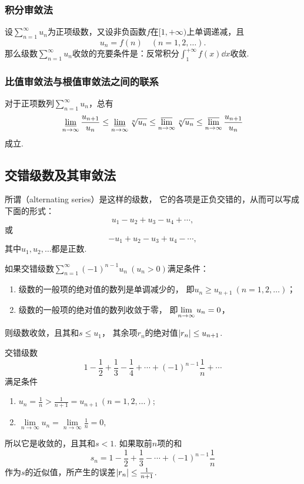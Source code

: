 \subsubsection{积分审敛法}
\begin{theorem}[积分审敛法]\label{theorem:无穷级数.积分审敛法}
设\(\sum\limits_{n=1}^\infty u_n\)为正项级数，又设非负函数\(f\)在\([1,+\infty)\)上单调递减，且\[
u_n = f(n)
\quad(n=1,2,\dotsc).
\]那么级数\(\sum\limits_{n=1}^\infty u_n\)收敛的充要条件是：反常积分\(\int_1^{+\infty} f(x) \dd{x}\)收敛.
\end{theorem}

\subsubsection{比值审敛法与根值审敛法之间的联系}
\begin{theorem}
对于正项数列\(\sum\limits_{n=1}^\infty u_n\)，总有\[
\varliminf\limits_{n\to\infty} \frac{u_{n+1}}{u_n}
\leq
\varliminf\limits_{n\to\infty} \sqrt[n]{u_n}
\leq
\varlimsup\limits_{n\to\infty} \sqrt[n]{u_n}
\leq
\varlimsup\limits_{n\to\infty} \frac{u_{n+1}}{u_n}
\]成立.
\end{theorem}

\subsection{交错级数及其审敛法}
所谓（alternating series）是这样的级数，
它的各项是正负交错的，从而可以写成下面的形式：\[
u_1 - u_2 + u_3 - u_4 + \dotsb,
\]或\[
-u_1 + u_2 - u_3 + u_4 - \dotsb,
\]其中\(u_1,u_2,\dotsc\)都是正数.

\begin{theorem}[莱布尼茨定理]\label{theorem:无穷级数.莱布尼茨定理}
如果交错级数\(\sum\limits_{n=1}^\infty (-1)^{n-1} u_n\ (u_n>0)\)满足条件：
\begin{enumerate}
\item 级数的一般项的绝对值的数列是单调减少的，
即\(u_n \geq u_{n+1}\ (n=1,2,\dotsc)\)；

\item 级数的一般项的绝对值的数列收敛于零，
即\(\lim\limits_{n\to\infty} {u_n}=0\)，
\end{enumerate}
则级数收敛，且其和\(s \leq u_1\)，
其余项\(r_n\)的绝对值\(\abs{r_n} \leq u_{n+1}\).
\end{theorem}

\begin{example}\label{example:无穷级数.交错级数1}
交错级数\[
1 - \frac{1}{2} + \frac{1}{3} - \frac{1}{4} + \dotsb + (-1)^{n-1} \frac{1}{n} + \dotsb
\]满足条件\begin{enumerate}
\item \(u_n = \frac{1}{n} > \frac{1}{n+1} = u_{n+1}\ (n=1,2,\dotsc)\);
\item \(\lim\limits_{n\to\infty} u_n = \lim\limits_{n\to\infty} \frac{1}{n} = 0\),
\end{enumerate}所以它是收敛的，且其和\(s < 1\).
如果取前\(n\)项的和\[
s_n = 1 - \frac{1}{2} + \frac{1}{3} - \dotsb + (-1)^{n-1} \frac{1}{n}
\]作为\(s\)的近似值，所产生的误差\(\abs{r_n} \leq \frac{1}{n+1}\).
\end{example}

